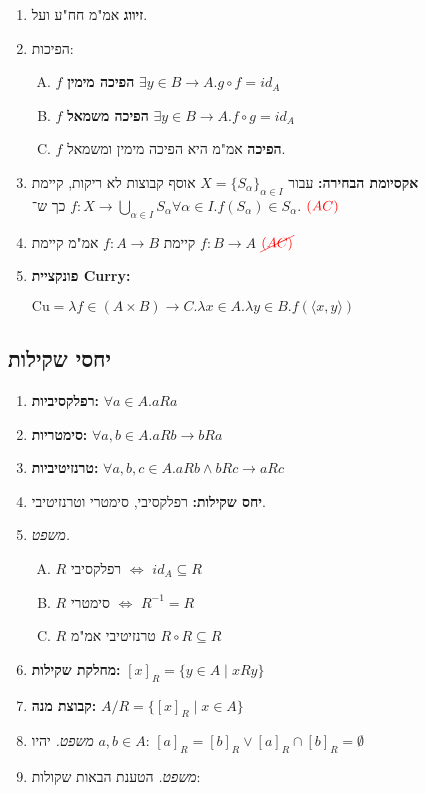 \documentclass[]{article}
\newcommand\sso   {\rightarrow}
\newcommand\ra    {\rangle}
\newcommand\la    {\langle}
\newcommand\op    {^{-1}}
\newcommand\ax[1]     {\color{blue}#1\color{black}}
\newcommand\tho       {\textit{משפט. }}
\newcommand\ac        {$\color{red}(AC)\color{black}$}
\newcommand\nac       {$\color{red}\cancel{(AC)}\color{black}$}
\begin{document}
\begin{multicols}{2}
\begin{enumerate}[resume]
\begin{enumerate}[A)]
			\end{enumerate}
			\item \textbf{זיווג} אמ"מ חח"ע ועל. 
			\item הפיכות: 
			\begin{enumerate}[A)]
				\item $f$ \textbf{הפיכה מימין} \hfill $\exists y \in B \to A. g \circ f = id_A$
				\item $f$ \textbf{הפיכה משמאל} \hfill $\exists y \in B \to A. f \circ g = id_A$
				\item $f$ \textbf{הפיכה} אמ"מ היא הפיכה מימין ומשמאל. 
			\end{enumerate}
			\item \ax{\textbf{אקסיומת הבחירה: }}עבור $X = \{S_\alpha\}_{\alpha \in I}$ אוסף קבוצות לא ריקות, קיימת $f \colon X \to \bigcup_{\alpha \in I} S_{\alpha}$ כך ש־$\forall \alpha \in I. f(S_\alpha) \in S_\alpha$. \hfill \ac
			\item קיימת $f \colon A \to B$ אמ"מ קיימת $f \colon B \to A$ \hfill \nac
			\item \textbf{פונקציית Curry: }
				
				\hfill $ \mathrm{Cu} = \lambda f \in (A \times B) \to C. \lambda x \in A. \lambda y \in B. f(\la x, y \ra) $
		\end{enumerate}
		\subsection{יחסי שקילות}
		\begin{enumerate}[resume]
			\item \textbf{רפלקסיביות: }\hfill $\forall a \in A. aRa$
			\item \textbf{סימטריות: }\hfill $\forall a, b \in A. aRb \sso bRa$
			\item \textbf{טרנזיטיביות: }\hfill $\forall a, b, c \in A. aRb \land bRc \sso aRc$
			\item \textbf{יחס שקילות: }רפלקסיבי, סימטרי וטרנזיטיבי. 
			\item \tho 
			\begin{enumerate}[A)]
				\item $R$ רפלקסיבי $\iff$ $id_A \subseteq R$
				\item $R$ סימטרי $\iff$ $R\op = R$
				\item $R$ טרנזיטיבי אמ"מ $R \circ R \subseteq R$
			\end{enumerate}
			\item \textbf{מחלקת שקילות: }\hfill $[x]_R = \{y \in A \mid xRy\}$
			\item \textbf{קבוצת מנה: }\hfill $A / R = \{[x]_R \mid x \in A\}$
			\item \tho יהיו $a, b \in A$: \hfill $ [a]_R = [b]_R \lor [a]_R \cap [b]_R = \emptyset $
			\item \tho הטענת הבאות שקולות: 
				

\end{enumerate}
\end{multicols}
\end{document}
